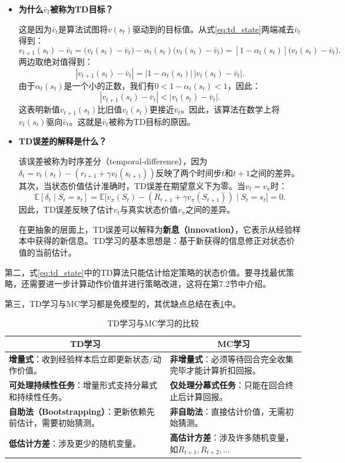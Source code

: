 \documentclass[UTF8]{article}
\begin{document}
\begin{itemize}
    \item \textbf{为什么$\bar{v}_t$被称为TD目标？}
    
    这是因为$\bar{v}_t$是算法试图将$v(s_t)$驱动到的目标值。从式\eqref{eq:td_state}两端减去$\bar{v}_t$得到：
    \[
    v_{t+1}(s_t) - \bar{v}_t = \big(v_t(s_t) - \bar{v}_t\big) - \alpha_t(s_t)\big(v_t(s_t) - \bar{v}_t\big)
    = [1 - \alpha_t(s_t)]\big(v_t(s_t) - \bar{v}_t\big).
    \]
    两边取绝对值得到：
    \[
    |v_{t+1}(s_t) - \bar{v}_t| = |1 - \alpha_t(s_t)|\,|v_t(s_t) - \bar{v}_t|.
    \]
    由于$\alpha_t(s_t)$是一个小的正数，我们有$0 < 1 - \alpha_t(s_t) < 1$，因此：
    \[
    |v_{t+1}(s_t) - \bar{v}_t| < |v_t(s_t) - \bar{v}_t|.
    \]
    这表明新值$v_{t+1}(s_t)$比旧值$v_t(s_t)$更接近$\bar{v}_t$。因此，该算法在数学上将$v_t(s_t)$驱向$\bar{v}_t$。这就是$\bar{v}_t$被称为TD目标的原因。

    \item \textbf{TD误差的解释是什么？}
    
    该误差被称为时序差分（temporal-difference），因为$\delta_t = v_t(s_t) - (r_{t+1} + \gamma v_t(s_{t+1}))$反映了两个时间步$t$和$t+1$之间的差异。其次，当状态价值估计准确时，TD误差在期望意义下为零。当$v_t = v_\pi$时：
    \[
    \mathbb{E}[\delta_t \mid S_t = s_t] = \mathbb{E}\big[v_\pi(S_t) - (R_{t+1} + \gamma v_\pi(S_{t+1})) \mid S_t = s_t\big] = 0.
    \]
    因此，TD误差反映了估计$v_t$与真实状态价值$v_\pi$之间的差异。
    
    在更抽象的层面上，TD误差可以解释为\textbf{新息（innovation）}，它表示从经验样本中获得的新信息。TD学习的基本思想是：基于新获得的信息修正对状态价值的当前估计。
\end{itemize}

第二，式\eqref{eq:td_state}中的TD算法只能估计给定策略的状态价值。要寻找最优策略，还需要进一步计算动作价值并进行策略改进，这将在第7.2节中介绍。

第三，TD学习与MC学习都是免模型的，其优缺点总结在表\ref{tab:td_vs_mc}中。

\begin{table}[h]
\centering
\caption{TD学习与MC学习的比较}
\label{tab:td_vs_mc}
\renewcommand{\arraystretch}{1.3}
\begin{tabular}{|p{}|p{}|}
\hline
\multicolumn{1}{|c|}{\textbf{TD学习}} & \multicolumn{1}{c|}{\textbf{MC学习}} \\
\hline
\textbf{增量式}：收到经验样本后立即更新状态/动作价值。 & \textbf{非增量式}：必须等待回合完全收集完毕才能计算折扣回报。 \\
\hline
\textbf{可处理持续性任务}：增量形式支持分幕式和持续性任务。 & \textbf{仅处理分幕式任务}：只能在回合终止后计算回报。 \\
\hline
\textbf{自助法（Bootstrapping）}：更新依赖先前估计，需要初始猜测。 & \textbf{非自助法}：直接估计价值，无需初始猜测。 \\
\hline
\textbf{低估计方差}：涉及更少的随机变量。 & \textbf{高估计方差}：涉及许多随机变量，如$R_{t+1}, R_{t+2}, \dots$ \\
\hline
\end{tabular}
\end{table}
\end{document}
